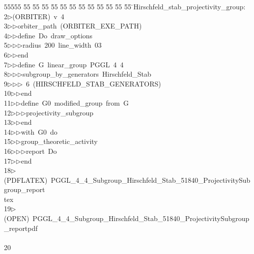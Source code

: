 %
%
\begin{tabbing}
55555 \= 55 \= 55 \= 55 \= 55 \= 55 \= 55 \= 55 \= 55 \= 55 \= 55 \= 55 \= 55 \= \>Hirschfeld\_stab\_projectivity\_group:\\[0pt]
2\>$\triangleright$\>(ORBITER)\ v\ 4\ \\[0pt]
3\>$\triangleright$\>$\triangleright$\>orbiter\_path\ (ORBITER\_EXE\_PATH)\ \\[0pt]
4\>$\triangleright$\>$\triangleright$\>define\ Do\ draw\_options\ \\[0pt]
5\>$\triangleright$\>$\triangleright$\>$\triangleright$\>radius\ 200\ line\_width\ 03\ \\[0pt]
6\>$\triangleright$\>$\triangleright$\>end\ \\[0pt]
7\>$\triangleright$\>$\triangleright$\>define\ G\ linear\_group\ PGGL\ 4\ 4\ \\[0pt]
8\>$\triangleright$\>$\triangleright$\>$\triangleright$\>subgroup\_by\_generators\ Hirschfeld\_Stab\ \\[0pt]
9\>$\triangleright$\>$\triangleright$\>$\triangleright$\ 6\ (HIRSCHFELD\_STAB\_GENERATORS)\ \\[0pt]
10\>$\triangleright$\>$\triangleright$\>end\ \\[0pt]
11\>$\triangleright$\>$\triangleright$\>define\ G0\ modified\_group\ from\ G\ \\[0pt]
12\>$\triangleright$\>$\triangleright$\>$\triangleright$\>projectivity\_subgroup\ \\[0pt]
13\>$\triangleright$\>$\triangleright$\>end\ \\[0pt]
14\>$\triangleright$\>$\triangleright$\>with\ G0\ do\ \\[0pt]
15\>$\triangleright$\>$\triangleright$\>group\_theoretic\_activity\ \\[0pt]
16\>$\triangleright$\>$\triangleright$\>$\triangleright$\>report\ Do\ \\[0pt]
17\>$\triangleright$\>$\triangleright$\>end\\[0pt]
18\>$\triangleright$\>(PDFLATEX)\ PGGL\_4\_4\_Subgroup\_Hirschfeld\_Stab\_51840\_ProjectivitySubgroup\_report\\[0pt]
\>tex\\[0pt]
19\>$\triangleright$\>(OPEN)\ PGGL\_4\_4\_Subgroup\_Hirschfeld\_Stab\_51840\_ProjectivitySubgroup\_reportpdf\\[0pt]
\>\\[0pt]
20\>\end{tabbing}
